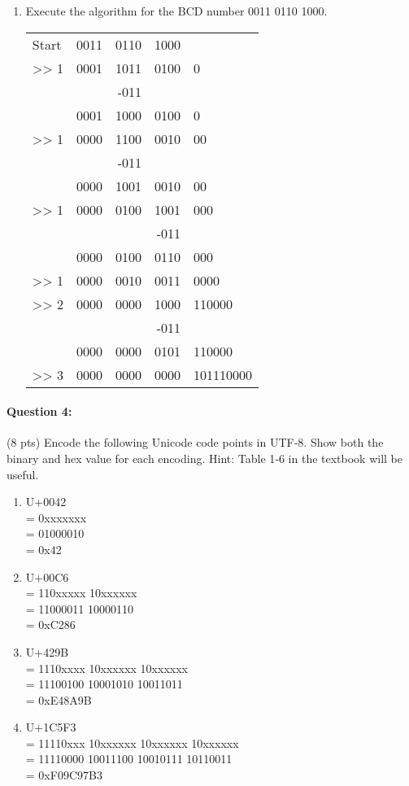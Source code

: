 \documentclass[12pt,letterpaper,notitlepage]{report}
\begin{document}
\begin{enumerate}[label=\alph*)]
\item Execute the algorithm for the BCD number 0011 0110 1000.
\\\begin{tabular}{ l || r | r | r || l }
   Start & 0011 & 0110 & 1000 &
\\ >> 1  & 0001 & 1011 & 0100 & 0
\\       &      & -011 &      & 
\\       & 0001 & 1000 & 0100 & 0
\\ >> 1  & 0000 & 1100 & 0010 & 00
\\ 		 &      & -011 &      & 
\\       & 0000 & 1001 & 0010 & 00
\\ >> 1  & 0000 & 0100 & 1001 & 000
\\       &      &      & -011 & 
\\       & 0000 & 0100 & 0110 & 000
\\ >> 1  & 0000 & 0010 & 0011 & 0000
\\ >> 2  & 0000 & 0000 & 1000 & 110000
\\       &      &      & -011 & 
\\       & 0000 & 0000 & 0101 & 110000
\\ >> 3  & 0000 & 0000 & 0000 & 101110000
\end{tabular}

\end{enumerate}

\paragraph{Question 4:}
(8 pts) Encode the following Unicode code points in UTF‐8. Show both the binary and hex value for each encoding. 
Hint: Table 1‐6 in the textbook will be useful.
\begin{enumerate}[label=\alph*)]
\item U+0042  \\= 0xxxxxxx \\= 01000010 \\= 0x42
\item U+00C6  \\= 110xxxxx 10xxxxxx \\= 11000011 10000110 \\= 0xC286
\item U+429B  \\= 1110xxxx 10xxxxxx 10xxxxxx \\= 11100100 10001010 10011011 \\= 0xE48A9B
\item U+1C5F3 \\= 11110xxx 10xxxxxx 10xxxxxx 10xxxxxx \\= 11110000 10011100 10010111 10110011 \\= 0xF09C97B3
\end{enumerate}
\end{document}
